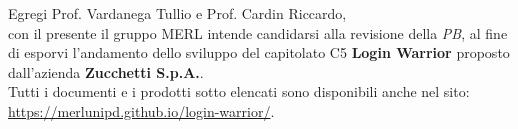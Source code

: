 Egregi Prof. Vardanega Tullio e Prof. Cardin Riccardo,\\
con il presente il gruppo MERL intende candidarsi alla revisione della \textit{PB}, al fine di esporvi l'andamento dello sviluppo del capitolato C5 \textbf{Login Warrior} proposto dall’azienda \textbf{Zucchetti S.p.A.}.\\
Tutti i documenti e i prodotti sotto elencati sono disponibili anche nel sito: \url{https://merlunipd.github.io/login-warrior/}. \\